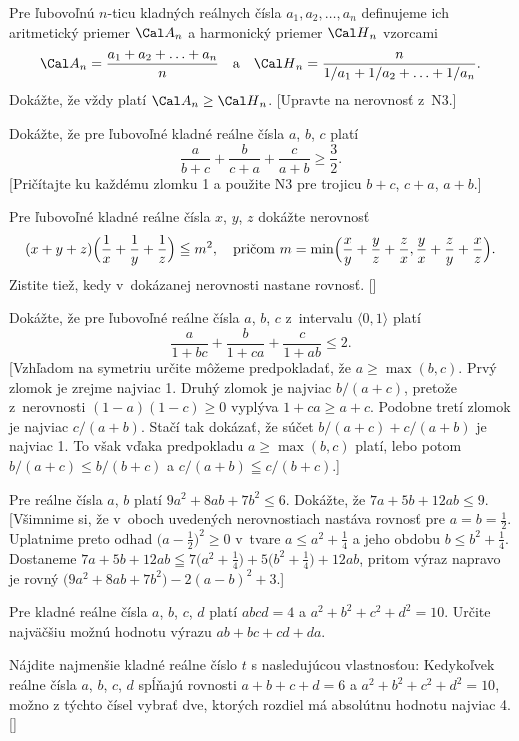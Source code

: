 {Pre ľubovoľnú $n$-ticu kladných reálnych čísla $a_1, a_2, \dots, a_n$
definujeme ich aritmetický priemer ${\Cal A}_n$ a harmonický priemer
${\Cal H}_n$ vzorcami
$$
{\Cal A}_n=\frac{a_1+a_2+\ldots + a_n}{n}\quad\hbox{a}\quad
{\Cal H}_n =\frac{n}{1/a_1+ 1/a_2+\ldots+1/a_n}.
$$
Dokážte, že vždy platí ${\Cal A}_n\geq{\Cal H}_n$.
[Upravte na nerovnosť z~N3.]

\D
Dokážte, že pre ľubovoľné kladné reálne čísla $a$, $b$, $c$ platí
$$
\frac{a}{b+c} + \frac{b}{c+a} + \frac{c}{a+b}\geq\frac32.
$$
[Pričítajte ku každému zlomku 1 a použite N3 pre trojicu
$b+c$, $c+a$, $a+b$.]

Pre ľubovoľné kladné reálne čísla $x$, $y$, $z$ dokážte
nerovnosť
$$
(x+y+z)\Bigl(\frac{1}{x}+\frac{1}{y}+\frac{1}{z}\Bigr)\leqq m^2,\quad
\text{pričom}\ m=\min\Bigl(\frac{x}{y}+\frac{y}{z}+\frac{z}{x},
\frac{y}{x}+\frac{z}{y}+\frac{x}{z}\Bigr).
$$
Zistite tiež, kedy v~dokázanej nerovnosti nastane rovnosť.
[]

Dokážte, že pre ľubovoľné reálne čísla $a$, $b$, $c$
z~intervalu $\langle 0, 1 \rangle$ platí
$$
\frac{a}{1+bc} + \frac{b}{1+ca} + \frac{c}{1+ab} \leq 2.
$$
[Vzhľadom na symetriu určite môžeme predpokladať,
že $a\geq\max(b,c)$.
Prvý zlomok je zrejme najviac 1. Druhý zlomok je
najviac $b/(a+c)$, pretože z~nerovnosti $(1-a)(1-c)\geq 0$
vyplýva $1+ca\geq a +c$.
Podobne tretí zlomok je najviac $c/(a+b)$.
Stačí tak dokázať, že súčet $b/(a+c)+c/(a+b)$ je najviac 1. To
však vďaka predpokladu $a\geq\max(b,c)$ platí, lebo potom
$b/(a+c)\leq b/(b+c)$ a $c/(a+b)\leqq c/(b+c)$.]

Pre reálne čísla $a$, $b$ platí $9a^2+8ab+7b^2\leq6$. Dokážte, že
$7a+5b+12ab \leq 9$.
[Všimnime si, že v~oboch uvedených nerovnostiach nastáva rovnosť pre
$a=b=\frac12$. Uplatnime preto odhad $\bigl(a-\frac12\bigr)^2 \geq 0$ v~tvare
$a\leq a^2+\frac14$ a jeho obdobu $b\leq b^2+\frac14$.
Dostaneme $7a+5b+12ab\leqq 7\bigl(a^2+\frac14\bigr)+5\bigl(b^2+\frac14\bigr)+12ab$,
pritom výraz napravo je rovný
$\bigl(9a^2+8ab+7b^2\bigr)-2(a-b)^2+3$.]

Pre kladné reálne čísla $a$, $b$, $c$, $d$ platí $abcd=4$ a
$a^2+b^2+c^2+d^2=10$. Určite najväčšiu možnú hodnotu výrazu
$ab+bc+cd+da$.\hfil\break
[\pdfklink{https://skmo.sk/dokument.php?id=994\#page=9}{https://skmo.sk/dokument.php?id=994\#page=9}]

Nájdite najmenšie kladné reálne číslo $t$ s nasledujúcou
vlastnosťou: Kedykoľvek reálne čísla $a$, $b$, $c$, $d$ spĺňajú
rovnosti $a+b+c+d=6$ a $a^2+b^2+c^2+d^2=10$, možno z týchto čísel
vybrať dve, ktorých rozdiel má absolútnu hodnotu najviac 4. []

}

